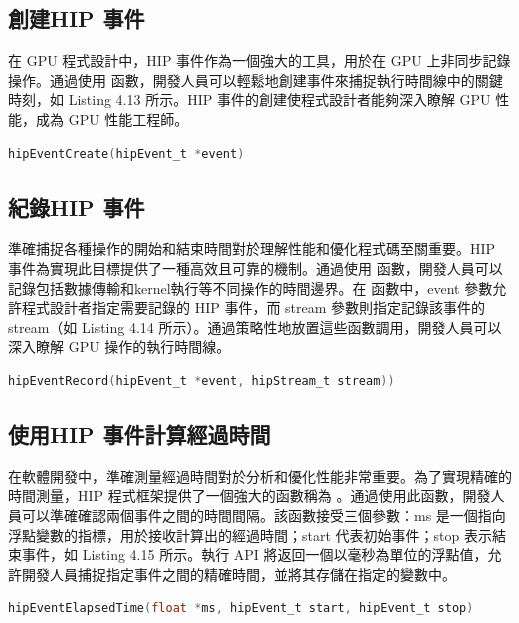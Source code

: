 \subsection{創建HIP 事件}
在 GPU 程式設計中，HIP 事件作為一個強大的工具，用於在 GPU 上非同步記錄操作。通過使用  函數，開發人員可以輕鬆地創建事件來捕捉執行時間線中的關鍵時刻，如 Listing 4.13 所示。HIP 事件的創建使程式設計者能夠深入瞭解 GPU 性能，成為 GPU 性能工程師。

\begin{lstlisting}[language=C, caption={使用hipEventCreate()創造事件}, label={13th:example}]
hipEventCreate(hipEvent_t *event)
\end{lstlisting}

\subsection{紀錄HIP 事件}
準確捕捉各種操作的開始和結束時間對於理解性能和優化程式碼至關重要。HIP 事件為實現此目標提供了一種高效且可靠的機制。通過使用  函數，開發人員可以記錄包括數據傳輸和kernel執行等不同操作的時間邊界。在  函數中，event 參數允許程式設計者指定需要記錄的 HIP 事件，而 stream 參數則指定記錄該事件的stream（如 Listing 4.14 所示）。通過策略性地放置這些函數調用，開發人員可以深入瞭解 GPU 操作的執行時間線。

\begin{lstlisting}[language=C, caption={使用hipEventRecord()紀錄HIP事件}, label={14th:example}]
hipEventRecord(hipEvent_t *event, hipStream_t stream))
\end{lstlisting}

\subsection{使用HIP 事件計算經過時間}
在軟體開發中，準確測量經過時間對於分析和優化性能非常重要。為了實現精確的時間測量，HIP 程式框架提供了一個強大的函數稱為 。通過使用此函數，開發人員可以準確確認兩個事件之間的時間間隔。該函數接受三個參數：ms 是一個指向浮點變數的指標，用於接收計算出的經過時間；start 代表初始事件；stop 表示結束事件，如 Listing 4.15 所示。執行  API 將返回一個以毫秒為單位的浮點值，允許開發人員捕捉指定事件之間的精確時間，並將其存儲在指定的變數中。

\begin{lstlisting}[language=C, caption={使用hipEventElapsedTime()計算經過時間}, label={15th:example}]
hipEventElapsedTime(float *ms, hipEvent_t start, hipEvent_t stop)
\end{lstlisting}


